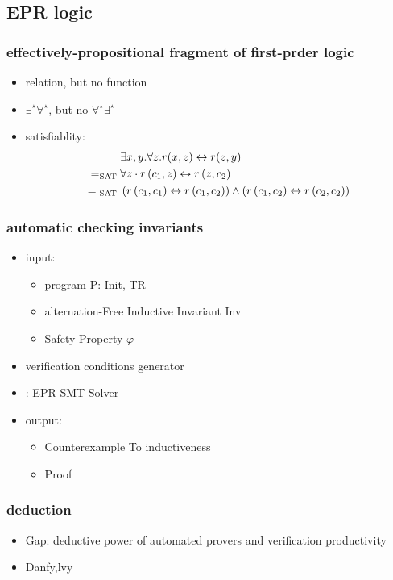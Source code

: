 \subsection{EPR logic}
\begin{frame}
    \frametitle{effectively-propositional fragment of first-prder logic}
    \begin{itemize}
        \item relation, but no function
        \item $\exists^{\star} \forall ^{\star}$, but no $\forall^{\star} \exists ^{\star}$
        \item satisfiablity:
        \begin{align}
            &\exists x, y . \forall z . r(x, z) \leftrightarrow r(z, y) \notag\\
            = _{\text {SAT }}& \forall z \cdot r\left(c_{1}, z\right) \leftrightarrow r\left(z, c_{2}\right) \notag\\
            = { }_{\text {SAT }}&\left(r\left(c_{1}, c_{1}\right) \leftrightarrow r\left(c_{1}, c_{2}\right)\right) \wedge\left(r\left(c_{1}, c_{2}\right) \leftrightarrow r\left(c_{2}, c_{2}\right)\right)
        \end{align}
    \end{itemize}
\end{frame}
\begin{frame}
    \frametitle{automatic checking invariants}
    \begin{itemize}
        \item input:
        \begin{itemize}
            \item program P: Init, TR
            \item alternation-Free Inductive Invariant Inv
            \item Safety Property $\varphi$
        \end{itemize}
        \item verification conditions generator
        \item: EPR SMT Solver
        \item output:
        \begin{itemize}
            \item Counterexample To inductiveness
            \item Proof
        \end{itemize}
    \end{itemize}
\end{frame}
\begin{frame}
    \frametitle{deduction}
    \begin{itemize}
        \item Gap: deductive power of automated provers and verification productivity
        \item Danfy,lvy
    \end{itemize}
\end{frame}